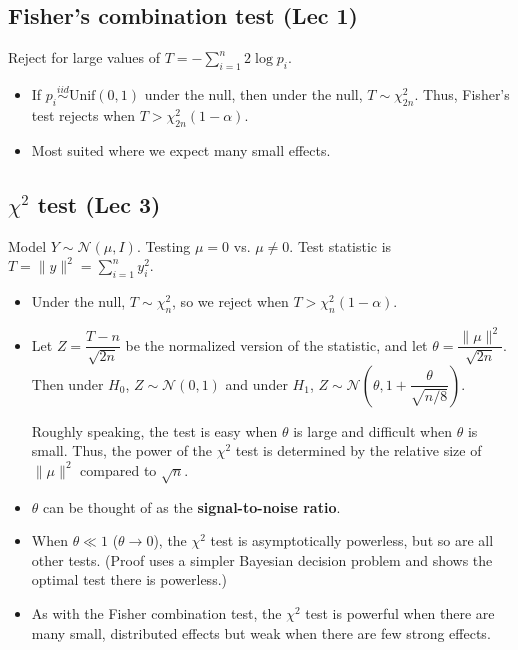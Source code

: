 \documentclass[twoside]{article}
\newcommand\dis{\displaystyle}
\newcommand\calN{\mathcal{N}}
\def\t{\theta}
\newcommand\goesto{\rightarrow}
\begin{document}
\subsection{Fisher's combination test (Lec 1)}
Reject for large values of $T = -\dis\sum_{i=1}^n 2 \log p_i$.

\begin{itemize}
\item If $p_i \stackrel{iid}{\sim} \text{Unif}(0,1)$ under the null, then under the null, $T \sim \chi_{2n}^2$. Thus, Fisher's test rejects when $T > \chi_{2n}^2(1 - \alpha)$.

\item Most suited where we expect many small effects.
\end{itemize}

\subsection{$\chi^2$ test (Lec 3)}

Model $Y \sim \calN(\mu, I)$. Testing $\mu = 0$ vs. $\mu \neq 0$. Test statistic is $T = \|y\|^2 = \dis\sum_{i=1}^n y_i^2$.
\begin{itemize}
\item Under the null, $T \sim \chi_n^2$, so we reject when $T > \chi_n^2(1 - \alpha)$.

\item Let $Z = \dfrac{T-n}{\sqrt{2n}}$ be the normalized version of the statistic, and let $\t = \dfrac{\|\mu\|^2}{\sqrt{2n}}$. Then under $H_0$, $Z \sim \calN(0,1)$ and under $H_1$, $Z \sim \calN \left(\t, 1 + \dfrac{\t}{\sqrt{n/8}} \right)$.

Roughly speaking, the test is easy when $\t$ is large and difficult when $\t$ is small. Thus, the power of the $\chi^2$ test is determined by the relative size of $\|\mu\|^2$ compared to $\sqrt{n}$.

\item $\t$ can be thought of as the \textbf{signal-to-noise ratio}.

\item When $\t \ll 1$ ($\t \goesto 0$), the $\chi^2$ test is asymptotically powerless, but so are all other tests. (Proof uses a simpler Bayesian decision problem and shows the optimal test there is powerless.)

\item As with the Fisher combination test, the $\chi^2$ test is powerful when there are many small, distributed effects but weak when there are few strong effects.

\end{itemize}
\end{document}
